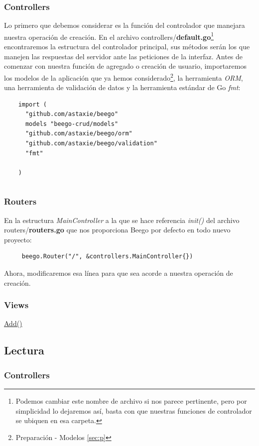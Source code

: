\documentclass[12pt]{article}
\begin{document}
\subsubsection{Controllers}
Lo primero que debemos considerar es la función del controlador que manejara
nuestra operación de creación. En el archivo controllers/\textbf{default.go}\footnote{Podemos cambiar este nombre de archivo si nos parece pertinente, pero por simplicidad lo dejaremos así, basta con que nuestras funciones de controlador se ubiquen en esa carpeta.}
encontraremos la estructura del controlador principal, sus métodos serán los que
manejen las respuestas del servidor ante las peticiones de la interfaz.
Antes de comenzar con nuestra función de agregado o creación de usuario, importaremos
los modelos de la aplicación que ya hemos considerado\footnote{Preparación - Modelos \ref{sec:p}},
la herramienta \textit{ORM}, una herramienta de validación de datos y la herramienta estándar de Go
\textit{fmt}:
\begin{verbatim}
    import (
      "github.com/astaxie/beego"
      models "beego-crud/models"
      "github.com/astaxie/beego/orm"
      "github.com/astaxie/beego/validation"
      "fmt"

    )
\end{verbatim}
\begin{lstlisting}[language=go]
\end{lstlisting}
\subsubsection{Routers}
En la estructura \textit{MainController} a la
que se hace referencia \textit{init()} del archivo routers/\textbf{routers.go} que nos
proporciona Beego por defecto en todo nuevo proyecto:
\begin{verbatim}
     beego.Router("/", &controllers.MainController{})
\end{verbatim}
Ahora, modificaremos esa línea para que sea acorde a nuestra operación de creación.
\subsubsection{Views}
\href{https://github.com/Kihui/Beego-CRUD/blob/master/controllers/default.go\#L29}{Add()}
\subsection{Lectura}
\subsubsection{Controllers}
\end{document}
